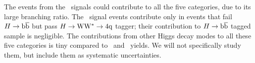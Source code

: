 The events from the \HbbVqq\ signals could contribute to all the five
categories, due to its large branching ratio.
The \HwwVqq\ signal events contribute only in events that fail
$H\to\mathrm{b\overline{b}}$ but pass $H\to{\rm W}{\rm W}^*\to4{\rm q}$ tagger; their contribution to
$H\to\mathrm{b\overline{b}}$ tagged sample is negligible.
The contributions from other Higgs decay modes to all these five categories
is tiny compared to \HbbVqq\ and \HwwVqq\ yields.  
We will not specifically study them, but include them as
 systematic uncertainties.






